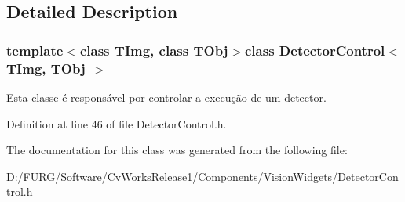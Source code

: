 \subsection{Detailed Description}
\subsubsection*{template$<$class T\+Img, class T\+Obj$>$class Detector\+Control$<$ T\+Img, T\+Obj $>$}

Esta classe é responsável por controlar a execução de um detector. 

Definition at line 46 of file Detector\+Control.\+h.



The documentation for this class was generated from the following file\+:\begin{DoxyCompactItemize}
\item 
D\+:/\+F\+U\+R\+G/\+Software/\+Cv\+Works\+Release1/\+Components/\+Vision\+Widgets/Detector\+Control.\+h\end{DoxyCompactItemize}
